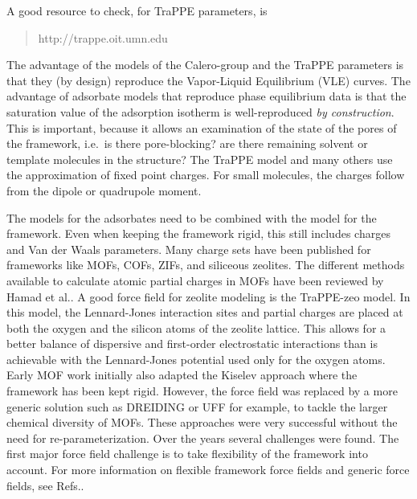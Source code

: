 \noindent
A good resource to check, for TraPPE parameters, is
\begin{quote}
http://trappe.oit.umn.edu
\end{quote}
The advantage of the models of the Calero-group and the TraPPE parameters is that they (by design) reproduce the Vapor-Liquid Equilibrium (VLE) curves.
The advantage of adsorbate models that reproduce phase equilibrium data is that the saturation value of the adsorption
isotherm is well-reproduced \emph{by construction}. This is important, because it allows an examination of the
state of the pores of the framework, i.e.\ is there pore-blocking? are there remaining solvent or template molecules in the structure?
The TraPPE model and many others use the approximation of fixed point charges.
For small molecules, the charges follow from the dipole or quadrupole moment.

The models for the adsorbates need to be combined with the model for the framework.
Even when keeping the framework rigid, this still includes charges and Van der Waals parameters.
Many charge sets have been published for frameworks like
MOFs\cite{Xu2010,Parkes2013,Nazarian2016},
COFs\cite{Zheng2010},
ZIFs\cite{Rana2011,GutierrezSevillano2013b},
and siliceous zeolites\cite{Wolffis2019}.
The different methods available to calculate atomic partial charges in MOFs have been reviewed by Hamad et al.\cite{Hamad2015}.
A good force field for zeolite modeling is the TraPPE-zeo model\cite{Bai2013}. In this model, the
Lennard-Jones interaction sites and partial charges are placed at both the oxygen and the silicon atoms of the zeolite lattice.
This allows for a better balance of dispersive and first-order electrostatic interactions than is
achievable with the Lennard-Jones potential used only for the oxygen atoms.
Early MOF work initially also adapted the Kiselev approach where the framework has been kept rigid. However, the force field was replaced by a more generic
solution such as DREIDING\cite{Mayo1990} or UFF\cite{Rappe1992} for example, to tackle the larger chemical diversity of MOFs. These approaches were very
successful without the need for re-parameterization\cite{Duren2004, Sarkisov2004, DurenSnurr2004, SarkisovDurenSnurr2004}.
Over the years several challenges were found. The first major force field challenge is to take flexibility
of the framework into account. For more information on flexible framework force fields and generic force fields, see Refs.\cite{Heinen2018,Dubbeldam2019}.

